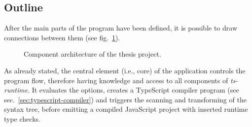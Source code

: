 \subsection{Outline}

After the main parts of the program have been defined, it is possible to draw connections between them (see fig.~\ref{fig:architecture}).
\begin{figure}
\centering

\caption{Component architecture of the thesis project.}
\label{fig:architecture}
\end{figure}
As already stated, the central element (i.e., core) of the application controls the program flow, therefore having knowledge and access to all components of \emph{ts-runtime}. It evaluates the options, creates a TypeScript compiler program (see sec.~\ref{sec:typescript-compiler}) and triggers the scanning and transforming of the syntax tree, before emitting a compiled JavaScript project with inserted runtime type checks. 

%
%
%
%
%

